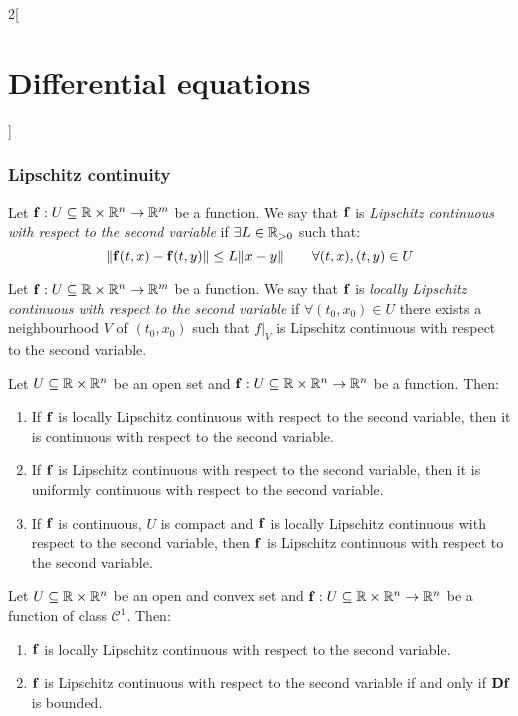 \documentclass[../../../main.tex]{subfiles}
\begin{document}
\begin{multicols}{2}[\section{Differential equations}]
  \subsubsection{Lipschitz continuity}
  \begin{definition}
    Let $\boldsymbol{\mathrm{f}}:U\subseteq\mathbb{R}\times\mathbb{R}^n\rightarrow\mathbb{R}^m$ be a function. We say that $\boldsymbol{\mathrm{f}}$ is \textit{Lipschitz continuous with respect to the second variable} if $\exists L\in\mathbb{R}_{>0}$ such that: $$\|\boldsymbol{\mathrm{f}}(t,x)-\boldsymbol{\mathrm{f}}(t,y)\|\leq L\|x-y\|\qquad\forall (t,x),(t,y)\in U$$
  \end{definition}
  \begin{definition}
    Let $\boldsymbol{\mathrm{f}}:U\subseteq\mathbb{R}\times\mathbb{R}^n\rightarrow\mathbb{R}^m$ be a function. We say that $\boldsymbol{\mathrm{f}}$ is \textit{locally Lipschitz continuous with respect to the second variable} if $\forall (t_0,x_0)\in U$ there exists a neighbourhood $V$ of $(t_0,x_0)$ such that $f|_V$ is Lipschitz continuous with respect to the second variable.
  \end{definition}
  \begin{prop}
    Let $U\subseteq\mathbb{R}\times\mathbb{R}^n$ be an open set and $\boldsymbol{\mathrm{f}}:U\subseteq\mathbb{R}\times\mathbb{R}^n\rightarrow\mathbb{R}^n$ be a function. Then:
    \begin{enumerate}
      \item If $\boldsymbol{\mathrm{f}}$ is locally Lipschitz continuous with respect to the second variable, then it is continuous with respect to the second variable.
      \item If $\boldsymbol{\mathrm{f}}$ is Lipschitz continuous with respect to the second variable, then it is uniformly continuous with respect to the second variable.
      \item If $\boldsymbol{\mathrm{f}}$ is continuous, $U$ is compact and $\boldsymbol{\mathrm{f}}$ is locally Lipschitz continuous with respect to the second variable, then $\boldsymbol{\mathrm{f}}$ is Lipschitz continuous with respect to the second variable.
    \end{enumerate}
  \end{prop}
  \begin{prop}
    Let $U\subseteq\mathbb{R}\times\mathbb{R}^n$ be an open and convex set and $\boldsymbol{\mathrm{f}}:U\subseteq\mathbb{R}\times\mathbb{R}^n\rightarrow\mathbb{R}^n$ be a function of class $\mathcal{C}^1$. Then:
    \begin{enumerate}
      \item $\boldsymbol{\mathrm{f}}$ is locally Lipschitz continuous with respect to the second variable.
      \item $\boldsymbol{\mathrm{f}}$ is Lipschitz continuous with respect to the second variable if and only if $\boldsymbol{\mathrm{Df}}$ is bounded.
    \end{enumerate}
  \end{prop}

\end{multicols}
\end{document}
